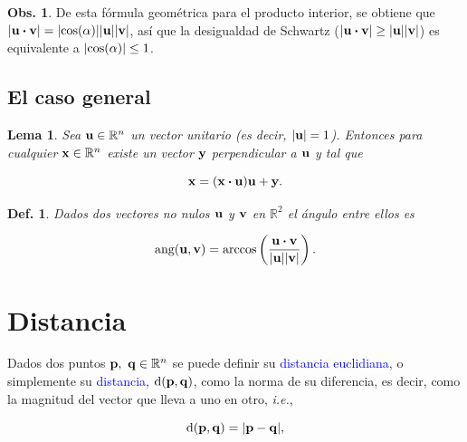 \documentclass{article}
\theoremstyle{definicion}
\newtheorem{definicion}{Def.}
\theoremstyle{definition}             %
\theoremstyle{definition}             %
\theoremstyle{definition}
\theoremstyle{definition}
\theoremstyle{observacion}
\newtheorem{obs}{Obs.}
\theoremstyle{definition}
\theoremstyle{plain}
\newtheorem{lemma}{Lema}
\theoremstyle{definition}
\theoremstyle{afirmacion}
\theoremstyle{notation}
\theoremstyle{definition}
\begin{document}
        \begin{obs}
            De esta fórmula geométrica para el producto interior, se obtiene que \(\abs{\vb{u} \vdot \vb{v}} = \abs{\cos(\alpha)}\abs{\vb{u}}\abs{\vb{v}}\), así que la desigualdad de Schwartz (\(\abs{\vb{u} \vdot \vb{v}} \geq \abs{\vb{u}}\abs{\vb{v}}\)) es equivalente a \(\abs{\cos(\alpha)} \leq 1\).
        \end{obs}

        \subsection{El caso general}

        \begin{lemma}
            Sea \(\vb{u} \in \mathbb{R}^{n}\) un vector unitario (es decir, \(\abs{\vb{u}} = 1\)). Entonces para cualquier \(\vb{x} \in \mathbb{R}^{n}\) existe un vector \(\vb{y}\) perpendicular a \(\vb{u}\) y tal que 

            \begin{equation*}
                \vb{x} = (\vb{x} \vdot \vb{u}) \vb{u} + \vb{y}.
            \end{equation*}
        \end{lemma}

        \begin{definicion}
            Dados dos vectores no nulos \(\vb{u}\) y \(\vb{v}\) en \(\mathbb{R}^{2}\) el ángulo entre ellos es

            \begin{equation*}
                \textrm{ang}(\vb{u}, \vb{v}) = \arccos\left(\dfrac{\vb{u} \vdot \vb{v}}{\abs{\vb{u}}\abs{\vb{v}}}\right).
            \end{equation*}
        \end{definicion}

        \section{Distancia}

        Dados dos puntos \(\vb{p},\ \vb{q} \in \mathbb{R}^{n}\) se puede definir su \textcolor{blue}{distancia euclidiana}, o simplemente su \textcolor{blue}{distancia}, \(\textrm{d}(\vb{p}, \vb{q})\), como la norma de su diferencia, es decir, como la magnitud del vector que lleva a uno en otro, \emph{i.e.}, 

        \begin{equation*}
            \textrm{d}(\vb{p}, \vb{q}) = \abs{\vb{p} - \vb{q}},
        \end{equation*}
\end{document}
